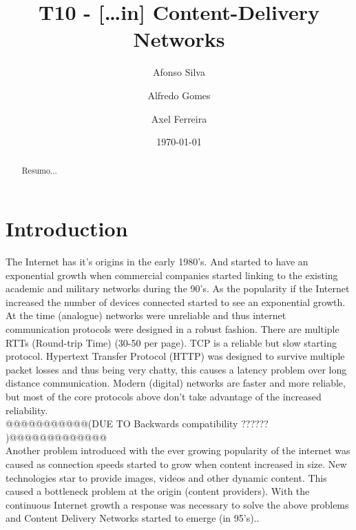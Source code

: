 \documentclass{llncs}
\begin{document}
\mainmatter
\title{T10 - [\dots in] Content-Delivery Networks}


\author{Afonso Silva\and Alfredo Gomes \and Axel Ferreira}



\date{\today}


\maketitle

\tableofcontents
\begin{abstract}
Resumo...
\end{abstract}
\section{Introduction} 									    %
The  Internet has it's origins in the early 1980's. And started to have an exponential growth when commercial companies started linking to the existing academic and military networks during the 90's. As the popularity if the Internet increased the number of devices connected started to see an exponential growth.\\
At the time (analogue) networks were unreliable and thus internet communication protocols were designed in a robust fashion. There are multiple RTTs (Round-trip Time) (30-50 per page). TCP is a reliable but slow starting protocol. Hypertext Transfer Protocol (HTTP) was designed to survive multiple packet losses and thus being very chatty, this causes a latency problem over long distance communication.
Modern (digital) networks are faster and more reliable, but most of the core protocols above don't take advantage of the increased reliability.\\ @@@@@@@@@@@(DUE TO Backwards compatibility ?????? )@@@@@@@@@@@@@\\
Another problem introduced with the ever growing popularity of the internet was caused as connection speeds started to grow when content increased in size. New technologies star to provide images, videos and other dynamic content. This caused a bottleneck problem at the origin (content providers).
With the continuous Internet growth a response was necessary to solve the above problems and Content Delivery Networks started to emerge (in 95's)..
\end{document}
